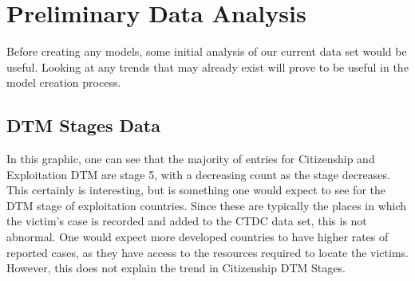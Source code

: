 \documentclass{article} %
\begin{document}
\newpage
\section{Preliminary Data Analysis}

Before creating any models, some initial analysis of our current data set would be useful. Looking at any trends that may already exist will prove to be useful in the model creation process.

\subsection{DTM Stages Data}

\FloatBarrier
\begin{figure}[H]
\end{figure}
\FloatBarrier

In this graphic, one can see that the majority of entries for Citizenship and Exploitation DTM are stage 5, with a decreasing count as the stage decreases. This certainly is interesting, but is something one would expect to see for the DTM stage of exploitation countries. Since these are typically the places in which the victim's case is recorded and added to the CTDC data set, this is not abnormal. One would expect more developed countries to have higher rates of reported cases, as they have access to the resources required to locate the victims. However, this does not explain the trend in Citizenship DTM Stages.
\end{document}
